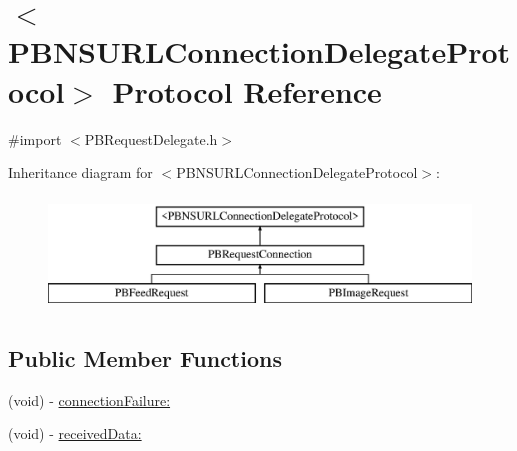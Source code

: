 \hypertarget{protocol_p_b_n_s_u_r_l_connection_delegate_protocol-p}{
\section{$<$PBNSURLConnectionDelegateProtocol$>$ Protocol Reference}
\label{protocol_p_b_n_s_u_r_l_connection_delegate_protocol-p}
}


{\ttfamily \#import $<$PBRequestDelegate.h$>$}

Inheritance diagram for $<$PBNSURLConnectionDelegateProtocol$>$:\begin{figure}[H]
\begin{center}
\leavevmode
\includegraphics[height=3cm]{protocol_p_b_n_s_u_r_l_connection_delegate_protocol-p}
\end{center}
\end{figure}
\subsection*{Public Member Functions}
\begin{DoxyCompactItemize}
\item 
(void) -\/ \hyperlink{protocol_p_b_n_s_u_r_l_connection_delegate_protocol-p_a0b7985884a8aebfbd6cfc1fd176482cd}{connectionFailure:}
\item 
(void) -\/ \hyperlink{protocol_p_b_n_s_u_r_l_connection_delegate_protocol-p_a496dbcef3501cd4547745aeb6a4359b6}{receivedData:}
\end{DoxyCompactItemize}


